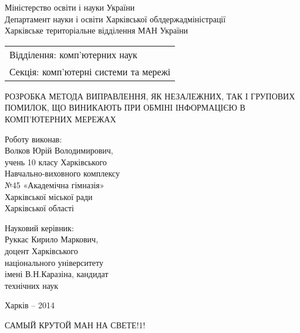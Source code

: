 \documentclass[14pt]{extarticle}
\begin{document}
\begin{titlepage}
\begin{center}
Міністерство освіти і науки України\\
Департамент науки і освіти Харківської облдержадміністрації\\
Харківське територіальне відділення МАН України\\
\end{center}
\par\null\par\null\par
\hfill
\begin{tabular}{@{}l@{}}
Відділення: комп'ютерних наук\\
Секція: комп'ютерні системи та
мережі
\end{tabular}
\par\null\par\null\par
\begin{center}
РОЗРОБКА МЕТОДА ВИПРАВЛЕННЯ, ЯК НЕЗАЛЕЖНИХ, ТАК І ГРУПОВИХ
ПОМИЛОК, ЩО ВИНИКАЮТЬ ПРИ ОБМІНІ ІНФОРМАЦІЄЮ В
КОМП'ЮТЕРНИХ МЕРЕЖАХ
\end{center}
\par\null\par\null\par\null
\begin{changemargin}{10cm}{0cm}
Роботу виконав:\\
Волков Юрій Володимирович,\\
учень 10 класу Харківського\\
Навчально-виховного комплексу\\
№45 «Академічна гімназія»\\
Харківської міської ради\\
Харківської області
\end{changemargin}
\par
\begin{changemargin}{10cm}{0cm}
Науковий керівник:\\
Руккас Кирило Маркович,\\
доцент Харківського\\
національного університету\\
імені В.Н.Каразіна, кандидат\\
технічних наук
\vspace*{\fill}
\end{changemargin}
\begin{center}
Харків -- 2014 
\end{center}
\end{titlepage}
САМЫЙ КРУТОЙ МАН НА СВЕТЕ!1!
\end{document}
